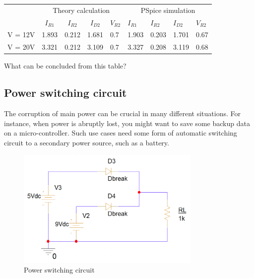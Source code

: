 \begin{center}

    \begin{tabular}{l|l|l|l|l|l|l|l|l|}
        \cline{2-9}
                                      & \multicolumn{4}{c|}{Theory calculation} & \multicolumn{4}{c|}{PSpice simulation}                                                                                                             \\ \cline{2-9}
                                      & \multicolumn{1}{c|}{$I_{R1}$}           & \multicolumn{1}{c|}{$I_{R2}$}          & \multicolumn{1}{c|}{$I_{D2}$} & \multicolumn{1}{c|}{$V_{R2}$} & $I_{R1}$ & $I_{R2}$ & $I_{D2}$ & $V_{R2}$ \\ \hline
        \multicolumn{1}{|l|}{V = 12V} & 1.893                                   & 0.212                                  & 1.681                         & 0.7                           & 1.903    & 0.203    & 1.701    & 0.67     \\ \hline
        \multicolumn{1}{|l|}{V = 20V} & 3.321                                   & 0.212                                  & 3.109                         & 0.7                           & 3.327    & 0.208    & 3.119    & 0.68     \\ \hline
    \end{tabular}
\end{center}

What can be concluded from this table?

\subsection{Power switching circuit}

The corruption of main power can be crucial in many different situations. For instance, when power is abruptly lost, you might want to save some backup data on a micro-controller. Such use cases need some form of automatic switching circuit to a secondary power source, such as a battery.\\

\newpage

\begin{figure}[!htp]
    \label{pic:halfwave_rectifier2}
    \centering
    \includegraphics[width = 3.5in]{source/picture/bai_2/diode_12.PNG}
    \caption{Power switching circuit}
    \label{lab02_ex031d}
\end{figure}

